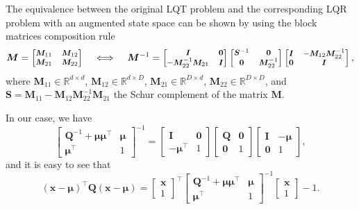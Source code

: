 \documentclass[10pt,a4paper]{article} %
\newcommand{\trsp}{{\scriptscriptstyle\top}}
\begin{document}
The equivalence between the original LQT problem and the corresponding LQR problem with an augmented state space can be shown by using the block matrices composition rule
\begin{equation*}
	\bm{M} = 
	\footnotesize %
	\begin{bmatrix} \bm{M}_{11} & \bm{M}_{12} \\ \bm{M}_{21} & \bm{M}_{22} \end{bmatrix} 
	\quad\iff\quad
	\bm{M}^{-1} =
	\footnotesize %
	\begin{bmatrix} \bm{I} & \bm{0} \\ -\bm{M}_{22}^{-1} \bm{M}_{21} & \bm{I} \end{bmatrix}
	\begin{bmatrix} \bm{S}^{-1} & \bm{0}
	\\ \bm{0} & \bm{M}_{22}^{-1} \end{bmatrix}
	\begin{bmatrix} \bm{I} & -\bm{M}_{12} \bm{M}_{22}^{-1} \\ \bm{0} & \bm{I} \end{bmatrix},
\end{equation*}
where $\bm{M}_{11}\!\in\!\mathbb{R}^{d\times d}$, $\bm{M}_{12}\!\in\!\mathbb{R}^{d\times D}$, $\bm{M}_{21}\!\in\!\mathbb{R}^{D\times d}$, $\bm{M}_{22}\!\in\!\mathbb{R}^{D\times D}$,
and $\bm{S} = \bm{M}_{11} - \bm{M}_{12} \bm{M}_{22}^{-1} \bm{M}_{21}$ the Schur complement of the matrix $\bm{M}$.

In our case, we have
\begin{equation*}
	\begin{bmatrix} \bm{Q}^{-1}\!+\!\bm{\mu}\bm{\mu}^\trsp & \bm{\mu} \\ \bm{\mu}^\trsp & 1 \end{bmatrix}^{-1}
	=
	\begin{bmatrix} \bm{I} & \bm{0} \\ -\bm{\mu}^\trsp & 1 \end{bmatrix}
	\begin{bmatrix} \bm{Q} & \bm{0} \\ \bm{0} & 1 \end{bmatrix}
	\begin{bmatrix} \bm{I} & -\bm{\mu} \\ \bm{0} & 1 \end{bmatrix},
\end{equation*}
and it is easy to see that
\begin{equation*}
	{(\bm{x}-\bm{\mu})}^\trsp \bm{Q} (\bm{x}-\bm{\mu}) =
	\begin{bmatrix} \bm{x} \\ 1 \end{bmatrix}^\trsp
	\begin{bmatrix} \bm{Q}^{-1}\!+\!\bm{\mu}\bm{\mu}^\trsp & \bm{\mu} \\ \bm{\mu}^\trsp & 1 \end{bmatrix}^{-1}
	\begin{bmatrix} \bm{x} \\ 1 \end{bmatrix} - 1.
\end{equation*}
\end{document}
